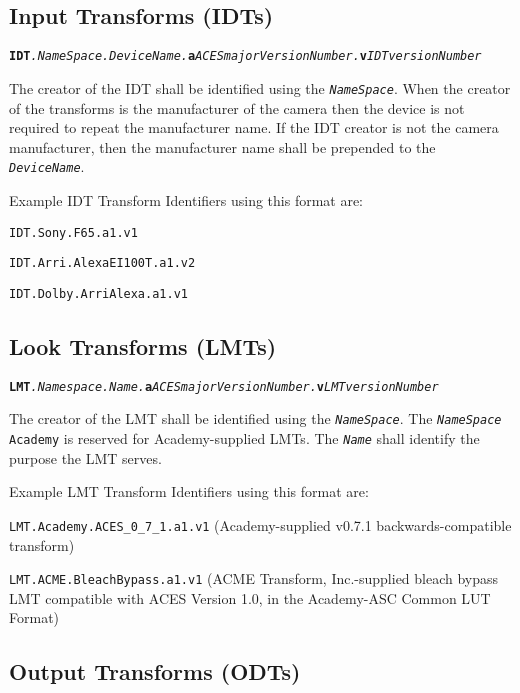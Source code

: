 \subsection{Input Transforms (IDTs)}

\texttt{\textbf{IDT}\textit{.NameSpace.DeviceName.}\textbf{a}\textit{ACESmajorVersionNumber.}\textbf{v}\textit{IDTversionNumber}}

The creator of the IDT shall be identified using the \texttt{\textit{NameSpace}}. When the creator of the transforms is the manufacturer of the camera then the device is not required to repeat the manufacturer name.  If the IDT creator is not the camera manufacturer, then the manufacturer name shall be prepended to the \texttt{\textit{DeviceName}}.

Example IDT Transform Identifiers using this format are: 
\begin{listize}
	\item \texttt{IDT.Sony.F65.a1.v1}
	\item \texttt{IDT.Arri.AlexaEI100T.a1.v2}
	\item \texttt{IDT.Dolby.ArriAlexa.a1.v1}
\end{listize}

\subsection{Look Transforms (LMTs)}

\texttt{\textbf{LMT}\textit{.Namespace.Name.}\textbf{a}\textit{ACESmajorVersionNumber.}\textbf{v}\textit{LMTversionNumber}}

The creator of the LMT shall be identified using the \texttt{\textit{NameSpace}}. The \texttt{\textit{NameSpace}} \texttt{Academy} is reserved for Academy-supplied LMTs. The \texttt{\textit{Name}} shall identify the purpose the LMT serves.

Example LMT Transform Identifiers using this format are: 
\begin{listize}
	\item \texttt{LMT.Academy.ACES\_0\_7\_1.a1.v1} (Academy-supplied v0.7.1 backwards-compatible transform)
	\item \texttt{LMT.ACME.BleachBypass.a1.v1} (ACME Transform, Inc.-supplied bleach bypass LMT compatible with ACES Version 1.0, in the Academy-ASC Common LUT Format)
\end{listize}

\subsection{Output Transforms (ODTs)}

